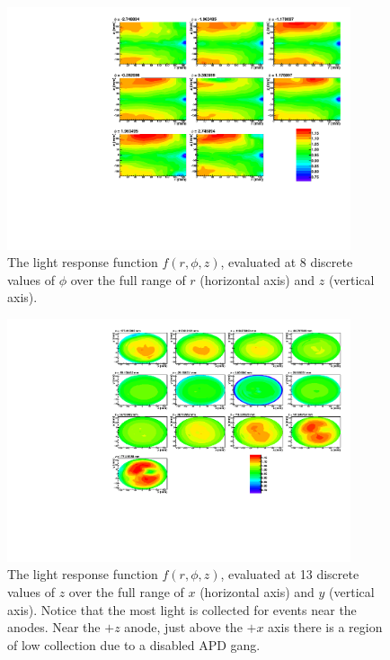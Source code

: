 \documentclass[herrin-thesis.tex]{subfiles}
\begin{document}
\begin{figure}
\centering
\includegraphics[width=0.9\textwidth]{./plots/lightmap_correction_phi_slices.pdf}
\caption[Correction function \(\phi\) slices]{The light response function \(f(r,\phi,z)\), evaluated at 8 discrete values of \(\phi\) over the full range of \(r\) (horizontal axis) and \(z\) (vertical axis).}
\label{fig:lightmap_correction_phi_slices}
\end{figure}

\begin{figure}
\centering
\includegraphics[width=0.9\textwidth]{./plots/lightmap_correction_z_slices.pdf}
\caption[Correction function \(z\) slices]{The light response function \(f(r,\phi,z)\), evaluated at 13 discrete values of \(z\) over the full range of \(x\) (horizontal axis) and \(y\) (vertical axis). Notice that the most light is collected for events near the anodes. Near the \(+z\) anode, just above the \(+x\) axis there is a region of low collection due to a disabled APD gang.}\label{fig:lightmap_correction_z_slices}
\end{figure}
\end{document}
